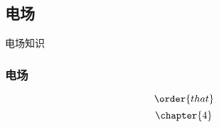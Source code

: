 \subsection{电场}
电场知识
\subsubsection{电场}
\begin{equation}
\order{that}
\end{equation}
\begin{equation}
\chapter{4}
\end{equation}
